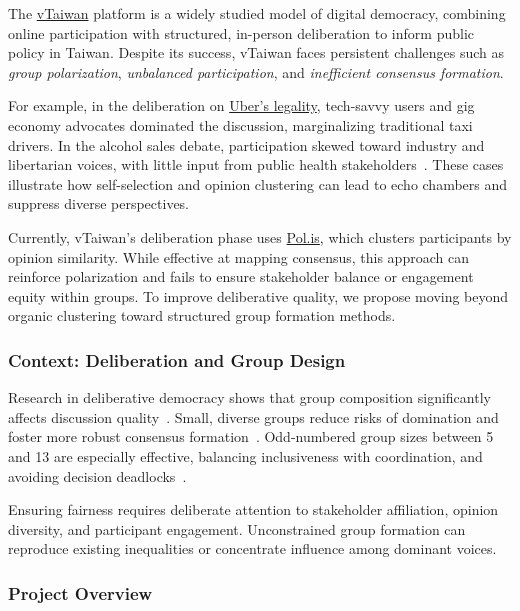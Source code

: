 The \href{https://vtaiwan.tw}{vTaiwan} platform is a widely studied model of digital democracy,
combining online participation with structured, in-person deliberation to inform public policy in Taiwan.
Despite its success, vTaiwan faces persistent challenges such as \textit{group polarization},
\textit{unbalanced participation}, and \textit{inefficient consensus formation}.

For example, in the deliberation on
\href{https://blog.pol.is/uber-responds-to-vtaiwans-coherent-blended-volition-3e9b75102b9b}{Uber’s legality},
tech-savvy users and gig economy advocates dominated the discussion,
marginalizing traditional taxi drivers.
In the alcohol sales debate, participation skewed toward industry and libertarian voices,
with little input from public health stakeholders~\parencite{tiku2018taiwan}.
These cases illustrate how self-selection and opinion clustering can lead to echo chambers
and suppress diverse perspectives.

Currently, vTaiwan’s deliberation phase uses \href{https://pol.is/home}{Pol.is},
which clusters participants by opinion similarity.
While effective at mapping consensus, this approach can reinforce polarization
and fails to ensure stakeholder balance or engagement equity within groups.
To improve deliberative quality, we propose moving beyond organic clustering
toward structured group formation methods.

\subsubsection*{Context: Deliberation and Group Design}

Research in deliberative democracy shows that group composition
significantly affects discussion quality~\parencite{fay2000group}.
Small, diverse groups reduce risks of domination
and foster more robust consensus formation~\parencite{anagnostopoulos2012groupformation}.
Odd-numbered group sizes between 5 and 13 are especially effective,
balancing inclusiveness with coordination,
and avoiding decision deadlocks~\parencite{fishkin2009deliberative, menon2011oddgroups}.

Ensuring fairness requires deliberate attention to stakeholder affiliation, opinion diversity,
and participant engagement.
Unconstrained group formation can reproduce existing inequalities
or concentrate influence among dominant voices.

\subsubsection*{Project Overview}

